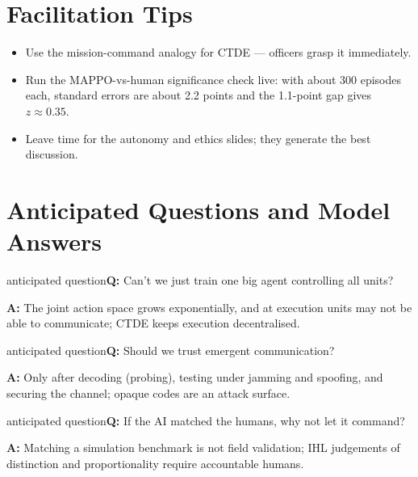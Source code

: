 \documentclass[11pt]{article}
\begin{document}
\section{Facilitation Tips}\begin{itemize}\item Use the mission-command analogy for CTDE --- officers grasp it immediately.\item Run the MAPPO-vs-human significance check live: with about 300 episodes each, standard errors are about 2.2 points and the 1.1-point gap gives $z\approx0.35$.\item Leave time for the autonomy and ethics slides; they generate the best discussion.\end{itemize}

\section{Anticipated Questions and Model Answers}

\begin{question}{anticipated question}\textbf{Q:} Can't we just train one big agent controlling all units?\par\smallskip\textbf{A:} The joint action space grows exponentially, and at execution units may not be able to communicate; CTDE keeps execution decentralised.\end{question}

\begin{question}{anticipated question}\textbf{Q:} Should we trust emergent communication?\par\smallskip\textbf{A:} Only after decoding (probing), testing under jamming and spoofing, and securing the channel; opaque codes are an attack surface.\end{question}

\begin{question}{anticipated question}\textbf{Q:} If the AI matched the humans, why not let it command?\par\smallskip\textbf{A:} Matching a simulation benchmark is not field validation; IHL judgements of distinction and proportionality require accountable humans.\end{question}
\end{document}
